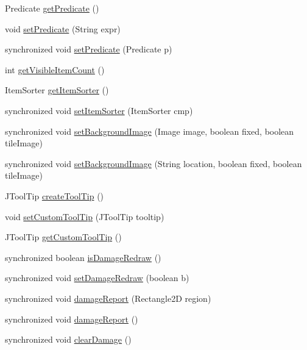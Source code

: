 \begin{DoxyCompactItemize}
\item 
\-Predicate \hyperlink{classprefuse_1_1_display_a9ba3eb2fb69ccc5d3bf009593cf8bdff}{get\-Predicate} ()
\item 
void \hyperlink{classprefuse_1_1_display_a629fe14c2397dbca9412ca15b809fda0}{set\-Predicate} (\-String expr)
\item 
synchronized void \hyperlink{classprefuse_1_1_display_abdf5a4be29ad618d9f1e64646e9a7181}{set\-Predicate} (\-Predicate p)
\item 
int \hyperlink{classprefuse_1_1_display_a80b39f22b19a92df064cf8fb1a8385bb}{get\-Visible\-Item\-Count} ()
\item 
\-Item\-Sorter \hyperlink{classprefuse_1_1_display_a4cb1cd06dd0703a7f4153cadd2a03d64}{get\-Item\-Sorter} ()
\item 
synchronized void \hyperlink{classprefuse_1_1_display_a469fa13cefdade65fa7d18dd230bf6cd}{set\-Item\-Sorter} (\-Item\-Sorter cmp)
\item 
synchronized void \hyperlink{classprefuse_1_1_display_a1af90a93a6a5a8683d8f1693094c22b1}{set\-Background\-Image} (\-Image image, boolean fixed, boolean tile\-Image)
\item 
synchronized void \hyperlink{classprefuse_1_1_display_ac29e64f10019c999f08d8eabd84f39d6}{set\-Background\-Image} (\-String location, boolean fixed, boolean tile\-Image)
\item 
\-J\-Tool\-Tip \hyperlink{classprefuse_1_1_display_aa00f46683d87ee0ce22a5b783ab03aee}{create\-Tool\-Tip} ()
\item 
void \hyperlink{classprefuse_1_1_display_ad919e832cc58bdf364f9721a61a903a7}{set\-Custom\-Tool\-Tip} (\-J\-Tool\-Tip tooltip)
\item 
\-J\-Tool\-Tip \hyperlink{classprefuse_1_1_display_a6b1eb584ffdd6dd0922d2a7f7f6ab5be}{get\-Custom\-Tool\-Tip} ()
\item 
synchronized boolean \hyperlink{classprefuse_1_1_display_ac01a0c5547a5f13e804bc4f2c7358aff}{is\-Damage\-Redraw} ()
\item 
synchronized void \hyperlink{classprefuse_1_1_display_a3b013d2c150dc5ba8e237e05f569f8ba}{set\-Damage\-Redraw} (boolean b)
\item 
synchronized void \hyperlink{classprefuse_1_1_display_a982d9f77c30d4956c86e9ddc2410214a}{damage\-Report} (\-Rectangle2\-D region)
\item 
synchronized void \hyperlink{classprefuse_1_1_display_ac919d24b02a59ac63014e361eef0609f}{damage\-Report} ()
\item 
synchronized void \hyperlink{classprefuse_1_1_display_a3211aa9393c93ebcfacccaa2e7629eb0}{clear\-Damage} ()

\end{DoxyCompactItemize}
